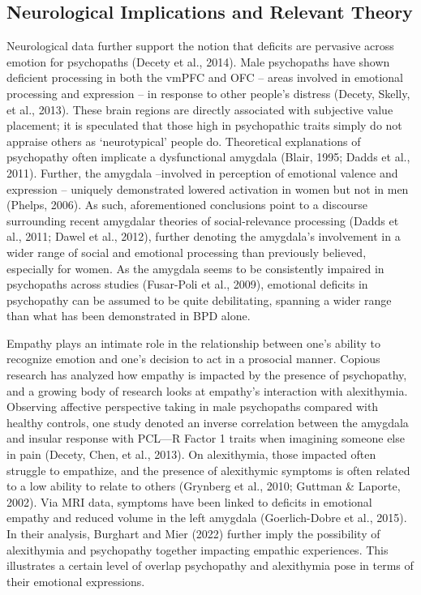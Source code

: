 \documentclass[
  man,floatsintext]{apa7}
\begin{document}
\hypertarget{neurological-implications-and-relevant-theory}{%
\subsection{Neurological Implications and Relevant Theory}\label{neurological-implications-and-relevant-theory}}

Neurological data further support the notion that deficits are pervasive across emotion for psychopaths (Decety et al., 2014). Male psychopaths have shown deficient processing in both the vmPFC and OFC -- areas involved in emotional processing and expression -- in response to other people's distress (Decety, Skelly, et al., 2013). These brain regions are directly associated with subjective value placement; it is speculated that those high in psychopathic traits simply do not appraise others as `neurotypical' people do. Theoretical explanations of psychopathy often implicate a dysfunctional amygdala (Blair, 1995; Dadds et al., 2011). Further, the amygdala --involved in perception of emotional valence and expression -- uniquely demonstrated lowered activation in women but not in men (Phelps, 2006). As such, aforementioned conclusions point to a discourse surrounding recent amygdalar theories of social-relevance processing (Dadds et al., 2011; Dawel et al., 2012), further denoting the amygdala's involvement in a wider range of social and emotional processing than previously believed, especially for women. As the amygdala seems to be consistently impaired in psychopaths across studies (Fusar-Poli et al., 2009), emotional deficits in psychopathy can be assumed to be quite debilitating, spanning a wider range than what has been demonstrated in BPD alone.

Empathy plays an intimate role in the relationship between one's ability to recognize emotion and one's decision to act in a prosocial manner. Copious research has analyzed how empathy is impacted by the presence of psychopathy, and a growing body of research looks at empathy's interaction with alexithymia. Observing affective perspective taking in male psychopaths compared with healthy controls, one study denoted an inverse correlation between the amygdala and insular response with PCL---R Factor 1 traits when imagining someone else in pain (Decety, Chen, et al., 2013). On alexithymia, those impacted often struggle to empathize, and the presence of alexithymic symptoms is often related to a low ability to relate to others (Grynberg et al., 2010; Guttman \& Laporte, 2002). Via MRI data, symptoms have been linked to deficits in emotional empathy and reduced volume in the left amygdala (Goerlich-Dobre et al., 2015). In their analysis, Burghart and Mier (2022) further imply the possibility of alexithymia and psychopathy together impacting empathic experiences. This illustrates a certain level of overlap psychopathy and alexithymia pose in terms of their emotional expressions.
\end{document}
